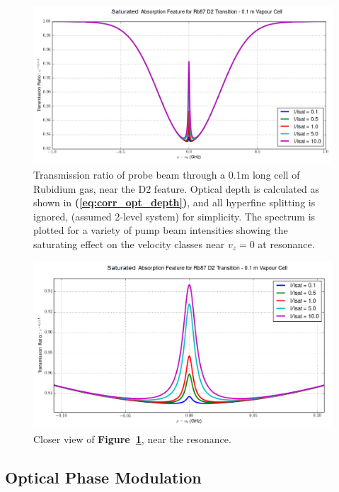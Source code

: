\begin{figure}[!hrt]
  \centering
  \includegraphics[scale=0.5]{rb_D2_single_absorption.png}
  \caption{Transmission ratio of probe beam through a 0.1m long cell of Rubidium
  gas, near the D2 feature. Optical depth is calculated as shown in
  \textbf{(\ref{eq:corr_opt_depth})},
  and all hyperfine splitting is ignored, (assumed 2-level system) for
  simplicity. The spectrum is plotted for a variety of pump beam intensities
  showing the saturating effect on the velocity classes near $v_z = 0$ at
  resonance.}
  \label{fig:rb87d2abs}
\end{figure}

\begin{figure}[!hrt]
  \centering
  \includegraphics[scale=0.5]{rb_D2_single_absorption_resonance.png}
  \caption{Closer view of \textbf{Figure~\ref{fig:rb87d2abs}}, near the
  resonance.}
  \label{fig:rb87d2abs_closer}
\end{figure}

\subsection{Optical Phase Modulation}

